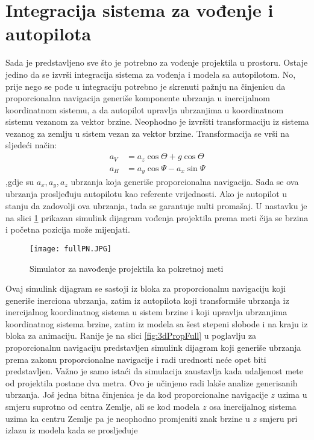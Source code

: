 \section{Integracija sistema za vođenje i autopilota}
Sada je predstavljeno sve što je potrebno za vođenje projektila u prostoru.
Ostaje jedino da se izvrši integracija sistema za vođenja i modela sa autopilotom. 
No, prije nego se pođe u integraciju potrebno je skrenuti pažnju na činjenicu da 
proporcionalna navigacija generiše komponente ubrzanja u inercijalnom koordinatnom sistemu, a 
da autopilot upravlja ubrzanjima u koordinatnom sistemu vezanom za vektor brzine. Neophodno 
je izvršiti transformaciju iz sistema vezanog za zemlju u sistem vezan za vektor brzine. 
Transformacija se vrši na sljedeći način:
\begin{align}
 \label{eq:wind1} a_{V} &= a_z\cos\Theta + g\cos\Theta\\ 
 \label{eq:wind2} a_{H} &= a_y\cos\Psi - a_x\sin\Psi
\end{align}
,gdje su $a_x,a_y,a_z$ ubrzanja koja generiše proporcionalna navigacija. 
Sada se ova ubrzanja prosljeđuju autopilotu kao referente vrijednosti. Ako je autopilot 
u stanju da zadovolji ova ubrzanja, tada se garantuje nulti promašaj. 
U nastavku je na slici \ref{fig:fullPN} prikazan simulink dijagram vođenja projektila prema meti čija se brzina i 
početna pozicija može mijenjati. 
\begin{figure}[!ht]
    \centering
    \texttt{[image: fullPN.JPG]}
    \caption{Simulator za navođenje projektila ka pokretnoj meti}
    \label{fig:fullPN}
\end{figure}
Ovaj simulink dijagram se sastoji iz bloka za proporcionalnu navigaciju koji generiše inerciona ubrzanja, 
zatim iz autopilota koji transformiše ubrzanja iz inercijalnog koordinatnog sistema u 
sistem brzine i koji upravlja ubrzanjima koordinatnog sistema brzine, zatim iz modela sa 
šest stepeni slobode i na kraju iz bloka za animaciju. Ranije je na slici \ref{fig:3dPropFull} u poglavlju 
za proporcionalnu navigaciju predstavljen simulink dijagram koji generiše ubrzanja 
prema zakonu proporcionalne navigacije i radi urednosti neće opet biti predstavljen. 
Važno je samo istaći da simulacija zaustavlja kada udaljenost mete od projektila 
postane dva metra. Ovo je učinjeno radi lakše analize generisanih ubrzanja. Još jedna bitna 
činjenica je da kod proporcionalne navigacije $z$ uzima u smjeru suprotno od 
centra Zemlje, ali se kod modela $z$ osa inercijalnog sistema uzima ka centru Zemlje 
pa je neophodno promjeniti znak brzine u $z$ smjeru pri izlazu iz modela kada se prosljeđuje 
